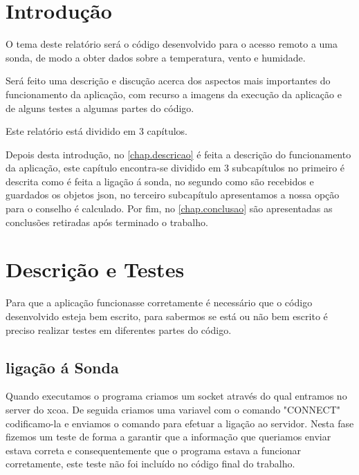 \documentclass[a4paper]{report}
\begin{document}
\tableofcontents


\clearpage
{}

\chapter{Introdução}
\label{chap.introducao}

O tema deste relatório será o código desenvolvido para o acesso remoto a uma sonda, de modo a obter dados sobre a temperatura, vento e humidade.

Será feito uma descrição e discução acerca dos aspectos mais importantes do funcionamento da aplicação, com recurso a imagens da execução da aplicação e de alguns testes a algumas partes do código.

Este relatório está dividido em 3 capítulos.

Depois desta introdução, no \autoref{chap.descricao} é feita a descrição do funcionamento da aplicação, este capítulo encontra-se dividido em 3 subcapítulos no primeiro é descrita como é feita a ligação á sonda, no segundo como são recebidos e guardados os objetos \ac{json}, no terceiro subcapítulo apresentamos a nossa opção para o conselho é calculado. Por fim, no \autoref{chap.conclusao} são apresentadas as conclusões retiradas após terminado o trabalho.

\chapter{Descrição e Testes}
\label{chap.descricao}

Para que a aplicação funcionasse corretamente é necessário que o código desenvolvido esteja bem escrito, para sabermos se está ou não bem escrito é preciso realizar testes em diferentes partes do código.

\section{ligação á Sonda}

Quando executamos o programa criamos um socket através do qual entramos no server do xcoa. De seguida criamos uma variavel com o comando "CONNECT" codificamo-la e enviamos o comando para efetuar a ligação ao servidor. Nesta fase fizemos um teste de forma a garantir que a informação que queriamos enviar estava correta e consequentemente que o programa estava a funcionar corretamente, este teste não foi incluído no código final do trabalho.
\end{document}
